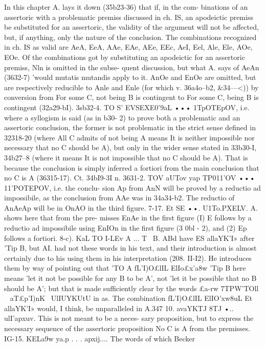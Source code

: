 {{{{{In this chapter A. lays it down (35b23-36) that if, in the com-
binations of an assertoric with a problematic premiss discussed
in ch. IS, an apodeictic premiss be substituted for an assertoric,
the validity of the argument will not be affected, but, if anything,
only the nature of the conclusion. The combinations recognized
in ch. IS as valid are AeA, EeA, AAe, EAe, AEe, EEc, AeI, Eel,
Ale, Ele, AOe, EOe. Of the combinations got by substituting an
apodeictic for an assertoric premiss, Nln is omitted in the subse-
quent discussion, but what A. says of AeAn (3632-7) 'would
mutatis mutandis apply to it. AnOe and EnOe are omitted, but
are respectively reducible to Anle and Enle (for which v. 36a4o--b2,
&34---<)) by conversion from For some C, not being B is contingent
to For some C, being B is contingent (32a29-bI).
3sb32-4. TO S' EVSEXE0'9aL ••• 1TpOTEpOV, i.e. where a syllogism
is said (as in b30- 2) to prove both a problematic and an assertoric
conclusion, the former is not problematic in the strict sense
defined in 32318-20 (where All C admits of not being A means
It is neither impossible nor necessary that no C should be A), but
only in the wider sense stated in 33b30-I, 34b27--8 (where it means
It is not impossible that no C should be A). That is because the
conclusion is simply inferred a fortiori from the main conclusion
that no C is A (36315-17). Ct. 34bI9-3I n.
3631-2. TOV aUTov yap TP011'OV ••• 11'POTEPOV, i.e. the conclu-
sion Ap from AnN will be proved by a reductio ad impossibile, as
the conclusion from AAe was in 34a34-b2. The reductio of AnAeAp
will be in OnAO in the third figure.
7-17. Et SE ••. U1To.PXELV. A. shows here that from the pre-
misses EnAe in the first figure (I) E follows by a reductio ad
impossibile using EnIOn in the first figure (3 0bl - 2), and (2) Ep
follows a fortiori.
8-c). KaL TO I-LEv A ... T~ B. ABd have ES allaYK'I» after 'Tip B,
but AI. had not these words in his text, and their introduction
is almost certainly due to his using them in his interpretation
(208. II-I2). He introduces them by way of pointing out that
'TO A fL'I)O£lIL ElIo£x'a8w 'Tip B here means 'let it not be possible for
any B to be A', not 'let it be possible that no B should be A';
but that is made sufficiently clear by the words £a-rw 7TPW'TOll ~
aT£p'I)nK~ UlIUYKUtU in as. The combination fL'I)O£lIL ElIO'xw8uL
Et allaYK'I» would, I think, be unparalleled in A.347
10. avaYKTJ 8TJ •.. ulI'apxuv. This is not meant to be a neces-
sary proposition, but to express the necessary sequence of the
assertoric proposition No C is A from the premisses.
IG-15. KELa9w ya.p . . . apxij.... The words of which Becker
}}}}}
